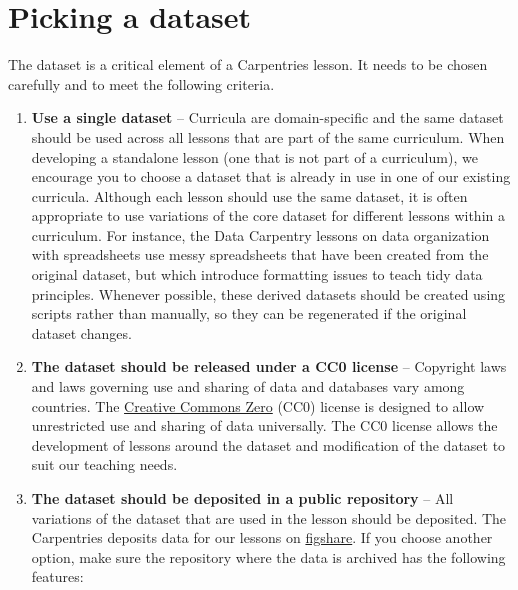 \documentclass[
]{book}
\begin{document}
\hypertarget{picking-a-dataset}{%
\section{Picking a dataset}\label{picking-a-dataset}}

The dataset is a critical element of a Carpentries lesson. It needs to be chosen carefully
and to meet the following criteria.

\begin{enumerate}
\def\labelenumi{\arabic{enumi}.}
\item
  \textbf{Use a single dataset} -- Curricula are domain-specific and the same dataset should be
  used across all lessons that are part of the same curriculum. When developing a
  standalone lesson (one that is not part of a curriculum), we encourage you to choose a
  dataset that is already in
  use in one of our existing curricula. Although each lesson should use the same dataset,
  it is often appropriate to use variations of the core dataset for different lessons within a
  curriculum. For instance, the Data Carpentry lessons on data organization with spreadsheets
  use messy spreadsheets that have been created from the
  original dataset, but which introduce formatting issues to teach tidy data principles.
  Whenever possible, these derived datasets should be created using scripts rather than
  manually, so they can be regenerated if the original dataset changes.
\item
  \textbf{The dataset should be released under a CC0 license} -- Copyright laws and laws
  governing use and sharing of data and databases vary among countries. The \href{https://creativecommons.org/share-your-work/public-domain/cc0/}{Creative Commons
  Zero} (CC0) license is designed to allow unrestricted use and sharing of data universally. The CC0
  license allows the development of lessons around the dataset and modification of the dataset
  to suit our teaching needs.
\item
  \textbf{The dataset should be deposited in a public repository} -- All variations of the
  dataset that are used in the lesson should be deposited. The Carpentries deposits
  data for our lessons on \href{https://figshare.com/}{figshare}.
  If you choose another option, make sure the repository where the data is archived
  has the following features:


\end{enumerate}
\end{document}

